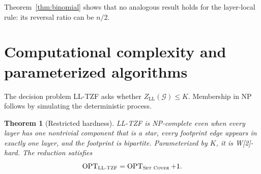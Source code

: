 \documentclass[11pt]{article}
\newtheorem{theorem}{Theorem}[section]
\theoremstyle{definition}
\theoremstyle{remark}
\newcommand{\calG}{\mathcal{G}}
\newcommand{\LL}{\mathrm{LL}}
\begin{document}
Theorem~\ref{thm:binomial} shows that no analogous result holds for the
layer-local rule: its reversal ratio can be $n/2$.

\section{Computational complexity and parameterized algorithms}

The decision problem \textnormal{\textsc{LL-TZF}} asks whether
$Z_{\LL}(\calG)\le K$.  Membership in NP follows by simulating the
deterministic process.

\begin{theorem}[Restricted hardness]\label{thm:hardness}
\textnormal{\textsc{LL-TZF}} is NP-complete even when every layer has one nontrivial
component that is a star, every footprint edge appears in exactly one layer,
and the footprint is bipartite.  Parameterized by $K$, it is W[2]-hard.
The reduction satisfies
\[
 \operatorname{OPT}_{\textnormal{\textsc{LL-TZF}}}
 =\operatorname{OPT}_{\textnormal{\textsc{Set Cover}}}+1.
\]
\end{theorem}
\end{document}
